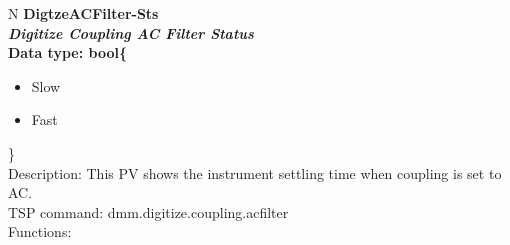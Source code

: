 \documentclass[openany]{article}
\begin{document}
		\begin{tabular}{N}
			\hline
			\bfseries DigtzeACFilter-Sts\label{pv:digtzeacfilter-sts} \\ \hline
			\emph{Digitize Coupling AC Filter Status} \\
			Data type: bool\{\begin{itemize}[noitemsep]
				\small
				\item[] Slow
				\item[] Fast
			\end{itemize}\} \\
			Description: This PV shows the instrument settling time when coupling is set to AC. \\
			TSP command: dmm.digitize.coupling.acfilter \\
			Functions: \\
			\arrayrulecolor{\FuncTableBorderColor}

		\end{tabular}
\end{document}
